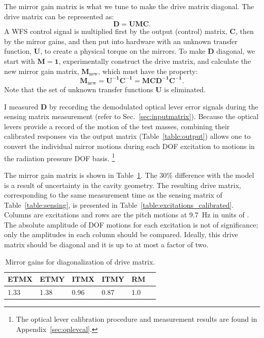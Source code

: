 The mirror gain matrix is what we tune to make the drive matrix
diagonal. The drive matrix can be represented as:
\begin{equation}
\mathbf{D} = \mathbf{U M C}.
\end{equation}
A WFS control signal is multiplied first by the output (control)
matrix, $\mathbf{C}$, then by the mirror gains, and then put into
hardware with an unknown transfer function, $\mathbf{U}$, to create a
physical torque on the mirrors. To make $\mathbf{D}$ diagonal, we
start with $\mathbf{M}=\mathbf{1}$, experimentally construct the drive
matrix, and calculate the new mirror gain matrix,
$\mathbf{M_{\mathrm{new}}}$, which must have the property:
\begin{equation}
\mathbf{M_{\mathrm{new}}} = \mathbf{U^{-1}} \mathbf{C^{-1}} = \mathbf{M C D^{-1} C^{-1}}.
\end{equation}
Note that the set of unknown transfer functions $\mathbf{U}$ is
eliminated.

I measured $\mathbf{D}$ by recording the demodulated optical lever
error signals during the sensing matrix measurement (refer to
Sec.~\ref{sec:inputmatrix}). Because the optical levers provide a
record of the motion of the test masses, combining their calibrated
responses via the output matrix (Table~\ref{table:output}) allows one
to convert the individual mirror motions during each DOF excitation to
motions in the radiation pressure DOF basis. \footnote{The optical
  lever calibration procedure and measurement results are found in
  Appendix~\ref{sec:oplevcal}.}

The mirror gain matrix is shown in Table~\ref{table:mirrorgains}. The
30\% difference with the model is a result of uncertainty in the
cavity geometry. The resulting drive matrix, corresponding to the same
measurement time as the sensing matrix of Table~\ref{table:sensing},
is presented in Table~\ref{table:excitations_calibrated}. Columns are
excitations and rows are the pitch motions at 9.7~Hz in units of
\microrad. The absolute amplitude of DOF motions for each excitation
is not of significance; only the amplitudes in each column should be
compared. Ideally, this drive matrix should be diagonal and it is up
to at most a factor of two.

\begin{table}
\centering
\caption[Mirror gains for diagonalization of drive matrix]{Mirror
  gains for diagonalization of drive matrix.} 
\begin{tabular}{l l l l l l}
\hline
ETMX & ETMY & ITMX & ITMY & RM & \\
\hline
1.33 & 1.38 & 0.96 & 0.87 & 1.0 \\
\hline
\end{tabular}
\label{table:mirrorgains}
\end{table}

